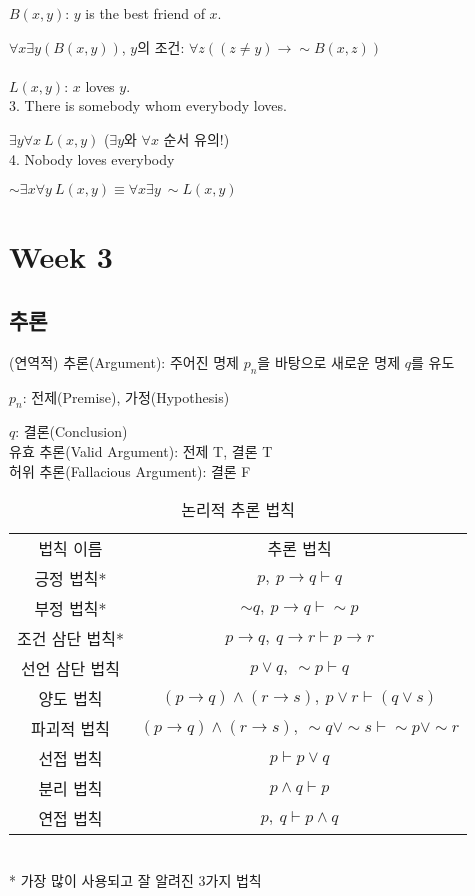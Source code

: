 $B(x, y)$: $y$ is the best friend of $x$.

$\forall x \exists y (B(x, y))$, $y$의 조건: $\forall z((z\neq y) \to \sim B(x, z))$\\\\
$L(x, y)$: $x$ loves $y$.\\
3. There is somebody whom everybody loves.

$\exists y\forall x\ L(x, y)$ ($\exists y$와 $\forall x$ 순서 유의!)\\
4. Nobody loves everybody

$\sim \exists x \forall y\ L(x, y) \equiv \forall x \exists y\ \sim L(x, y)$
\section{Week 3}
\subsection{추론}
(연역적) 추론(Argument): 주어진 명제 $p_n$을 바탕으로 새로운 명제 $q$를 유도

$p_n$: 전제(Premise), 가정(Hypothesis)

$q$: 결론(Conclusion)\\
유효 추론(Valid Argument): 전제 T, 결론 T\\
허위 추론(Fallacious Argument): 결론 F
\begin{table}[H]
    \caption {논리적 추론 법칙}
    \centering
    \begin{tabular}[1.5]{c|c}
        법칙 이름&추론 법칙\\
        \Xhline{3\arrayrulewidth}
        긍정 법칙*&$p,\ p\to q\vdash q$\\
        \hline
        부정 법칙*&$\sim q,\ p \to q\vdash \sim p$\\
        \hline
        조건 삼단 법칙*&$p \to q,\ q \to r\vdash p \to r$\\
        \hline
        선언 삼단 법칙&$p \lor q,\ \sim p\vdash q$\\
        \hline
        양도 법칙&$(p\to q)\land(r\to s),\ p\lor r\vdash (q\lor s)$\\
        \hline
        파괴적 법칙&$(p\to q)\land(r\to s),\ \sim q \lor \sim s\vdash \sim p \lor \sim r$\\
        \hline
        선접 법칙&$p \vdash p \lor q$\\
        \hline
        분리 법칙&$p \land q\vdash p$\\
        \hline
        연접 법칙&$p,\ q\vdash p \land q$
    \end{tabular}
    \\
    \bigskip
    * 가장 많이 사용되고 잘 알려진 3가지 법칙
\end{table}
